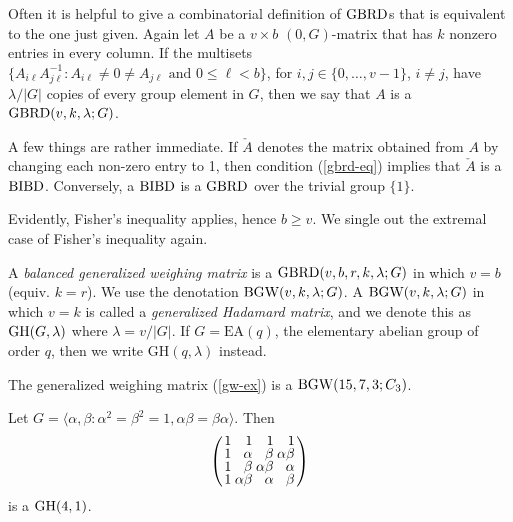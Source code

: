 \documentclass[../../../main]{subfiles}
\begin{document}
 Often it is helpful to give a combinatorial definition of $\text{GBRD}$s that is equivalent to the one just given. Again let $A$ be a $v \times b$ $(0,G)$-matrix that has $k$ nonzero entries in every column. If the multisets $\{A_{i\ell}A_{j\ell}^{-1} : A_{i\ell} \neq 0 \neq A_{j\ell} \text{ and } 0 
 \leq \ell < b\}$, for $i,j \in \{0,\dots,v-1\}$, $i \neq j$, have $\lambda/|G|$ copies of every group element in $G$, then we say that $A$ is a $\text{GBRD}(v,k,\lambda;G)$.
 
 A few things are rather immediate. If $\check A$ denotes the matrix obtained from $A$ by changing each non-zero entry to 1, then condition (\ref{gbrd-eq}) implies that $\check A$ is a $\text{BIBD}$. Conversely, a $\text{BIBD}$ is a $\text{GBRD}$ over the trivial group $\{1\}$.
 
 Evidently, Fisher's inequality applies, hence $b \geq v$. We single out the extremal case of Fisher's inequality again.
 
 \begin{defin}\label{bgw definition}
 A {\it balanced generalized weighing matrix} is a $\text{GBRD}(v,b,r,k,\lambda;G)$ in which $v = b$ (equiv. $k = r$). We use the denotation $\text{BGW}(v,k,\lambda;G)$. A $\text{BGW}(v,k,\lambda;G)$ in which $v = k$ is called a {\it generalized Hadamard matrix}, and we denote this as $\text{GH}(G,\lambda)$ where $\lambda = v/|G|$. If $G = \mathrm{EA}(q)$, the elementary abelian group of order $q$, then we write $\mathrm{GH}(q,\lambda)$ instead.
 \end{defin}
 
 \begin{ex}
  The generalized weighing matrix (\ref{gw-ex}) is a $\text{BGW}(15,7,3;C_3)$.
 \end{ex}
 
 \begin{ex}
  Let $G=\langle \alpha,\beta : \alpha^2=\beta^2=1, \alpha\beta=\beta\alpha \rangle$. Then
  \begin{equation}\label{gh-ex}
  \arraycolsep=1.25pt\def\arraystretch{0.625}
   \left(\begin{array}{rrrr}
    1 & 1 & 1 & 1 \\
    1 & \alpha & \beta & \alpha\beta \\
    1 & \beta & \alpha\beta & \alpha \\
    1 & \alpha\beta & \alpha & \beta
   \end{array}\right)
  \end{equation}
  is a $\text{GH}(4,1)$.
 \end{ex}
 
\end{document}
